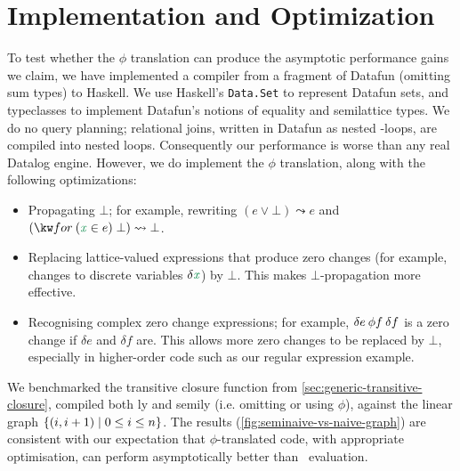 \section{Implementation and Optimization}
\label{sec:implementation}

\newcommand\rewrites\leadsto

To test whether the $\phi$ translation can produce the asymptotic performance
gains we claim, we have implemented a compiler from a fragment of Datafun
(omitting sum types) to Haskell.
%
We use Haskell's \texttt{Data.Set} to represent Datafun sets, and
typeclasses to implement Datafun's notions of equality and semilattice types.
%
We do no query planning; relational joins, written in Datafun as nested
-loops, are compiled into nested loops.
%
Consequently our performance is worse than any real Datalog engine.
%
However, we do implement the $\phi$ translation, along with the following
optimizations:

\begin{itemize}
\item Propagating $\bot$; for example, rewriting $(e \vee \bot) \rewrites e$ and
  $(\efor{x}{e} \bot) \rewrites \bot$. %

\item Replacing lattice-valued expressions that produce zero changes (for
  example, changes to discrete variables $\delta \dvar x$) by $\bot$. This makes
  $\bot$-propagation more effective.

\item Recognising complex zero change expressions; for example, $\delta e \<\phi
  f \<\delta f$ is a zero change if $\delta e$ and $\delta f$ are. This allows
  more zero changes to be replaced by $\bot$, especially in higher-order code
  such as our regular expression example. 
\end{itemize}

We benchmarked the transitive closure function  from
\cref{sec:generic-transitive-closure}, compiled both \naive{}ly and
semi\naive{}ly (i.e. omitting or using $\phi$), against the linear graph
$\{(i,i+1) \mathrel{|} 0 \le i \le n\}$. The results
(\cref{fig:seminaive-vs-naive-graph}) are consistent with our expectation that
$\phi$-translated code, with appropriate optimisation, can perform
asymptotically better than \naive\ evaluation.



